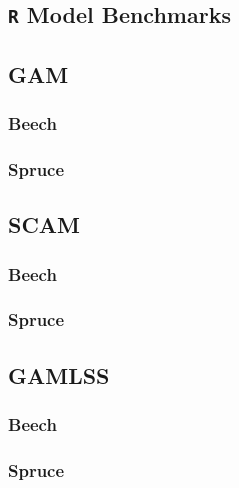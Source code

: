 \begin{landscape}

  \section{\texttt{R} Model Benchmarks}


  \subsection{GAM}
  \subsubsection{Beech}
  
  \subsubsection{Spruce}
  

  \subsection{SCAM}
  \subsubsection{Beech}
  
  \subsubsection{Spruce}
  

  \subsection{GAMLSS}
  \subsubsection{Beech}
  
  \subsubsection{Spruce}
  

\end{landscape}

